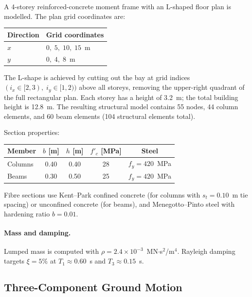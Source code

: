 A 4-storey reinforced-concrete moment frame with an L-shaped floor
plan is modelled.  The plan grid coordinates are:

\begin{center}
\begin{tabular}{ll}
  \toprule
  Direction & Grid coordinates \\
  \midrule
  $x$       & $0,\; 5,\; 10,\; 15$~m \\
  $y$       & $0,\; 4,\; 8$~m \\
  \bottomrule
\end{tabular}
\end{center}

The L-shape is achieved by cutting out the bay at grid indices
$(i_x \in [2,3),\; i_y \in [1,2))$ above all storeys, removing the
upper-right quadrant of the full rectangular plan.  Each storey has a
height of 3.2~m; the total building height is 12.8~m.  The resulting
structural model contains 55 nodes, 44 column elements, and 60 beam
elements (104 structural elements total).

Section properties:

\begin{center}
\begin{tabular}{lcccc}
  \toprule
  Member & $b$ [m] & $h$ [m] & $f'_c$ [MPa]
         & Steel \\
  \midrule
  Columns & 0.40 & 0.40 & 28 & $f_y = 420$~MPa \\
  Beams   & 0.30 & 0.50 & 25 & $f_y = 420$~MPa \\
  \bottomrule
\end{tabular}
\end{center}

Fibre sections use Kent--Park confined concrete (for columns with
$s_t = 0.10$~m tie spacing) or unconfined concrete (for beams), and
Menegotto--Pinto steel with hardening ratio $b = 0.01$.

\paragraph{Mass and damping.}
Lumped mass is computed with $\rho = 2.4 \times 10^{-3}$~MN$\cdot$s$^2$/m$^4$.
Rayleigh damping targets $\xi = 5\%$ at $T_1 \approx 0.60$~s and
$T_3 \approx 0.15$~s.


\subsection{Three-Component Ground Motion}
\label{ssec:nlevo-ground-motion}

